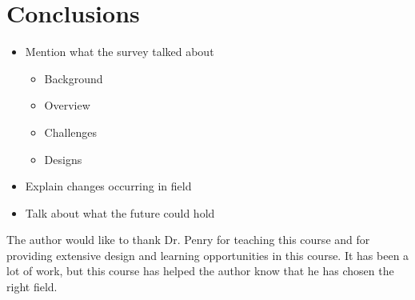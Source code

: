 \documentclass[prodmode,acmtecs]{acmsmall} %
\begin{document}
\section{Conclusions} \label{sec:conclusions}
\begin{itemize}
\item Mention what the survey talked about
  \begin{itemize}
  \item Background
  \item Overview
  \item Challenges
  \item Designs
  \end{itemize}
\item Explain changes occurring in field
\item Talk about what the future could hold
\end{itemize}

\begin{acks}
The author would like to thank Dr. Penry for teaching this course and for
providing extensive design and learning opportunities in this course. It has
been a lot of work, but this course has helped the author know that he has
chosen the right field.
\end{acks}




\end{document}

